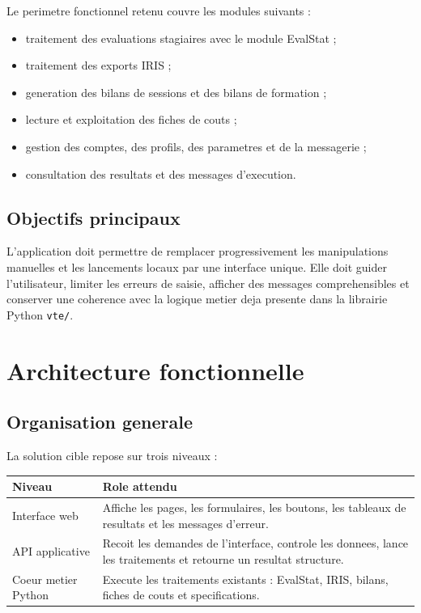 \documentclass[11pt,a4paper]{report}
\begin{document}
Le perimetre fonctionnel retenu couvre les modules suivants :

\begin{itemize}
  \item traitement des evaluations stagiaires avec le module EvalStat ;
  \item traitement des exports IRIS ;
  \item generation des bilans de sessions et des bilans de formation ;
  \item lecture et exploitation des fiches de couts ;
  \item gestion des comptes, des profils, des parametres et de la messagerie ;
  \item consultation des resultats et des messages d'execution.
\end{itemize}

\section{Objectifs principaux}

L'application doit permettre de remplacer progressivement les manipulations manuelles et les lancements locaux par une interface unique. Elle doit guider l'utilisateur, limiter les erreurs de saisie, afficher des messages comprehensibles et conserver une coherence avec la logique metier deja presente dans la librairie Python \texttt{vte/}.

\chapter{Architecture fonctionnelle}

\section{Organisation generale}

La solution cible repose sur trois niveaux :

\begin{longtable}{L{4cm} L{10cm}}
\toprule
{}
\textbf{Niveau} & \textbf{Role attendu} \\
\midrule
Interface web & Affiche les pages, les formulaires, les boutons, les tableaux de resultats et les messages d'erreur. \\
API applicative & Recoit les demandes de l'interface, controle les donnees, lance les traitements et retourne un resultat structure. \\
Coeur metier Python & Execute les traitements existants : EvalStat, IRIS, bilans, fiches de couts et specifications. \\
\bottomrule
\end{longtable}
\end{document}

